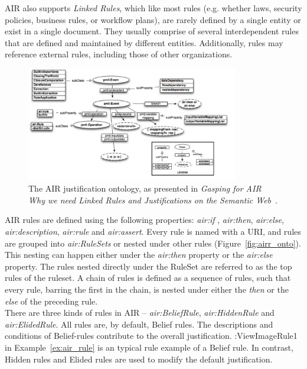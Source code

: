 AIR also supports \textit{Linked Rules}, which like most rules (e.g. whether laws, security policies, business rules, or workflow plans), are rarely defined by a single entity or exist in a single document. They usually comprise of several interdependent rules that are defined and maintained by different entities. Additionally, rules may reference external rules, including those of other organizations.\\

\begin{figure}[h]
  \begin{center}
    \includegraphics[width=350px]{img/airj_ontology.jpg}
        \caption{The AIR justification ontology, as presented in \textit{Gasping for AIR Why we need Linked Rules and Justifications on the Semantic Web}~\cite{kagal2011gasping}.}
        \label{fig:airj_onto}
  \end{center}
\end{figure}

AIR rules are defined using the following properties: \textit{air:if} , \textit{air:then}, \textit{air:else}, \textit{air:description}, \textit{air:rule} and \textit{air:assert}. Every rule is named with a URI, and rules are grouped into \textit{air:RuleSets} or nested under other rules (Figure~\ref{fig:airr_onto}). This nesting can happen either under the \textit{air:then} property or the \textit{air:else} property. The rules nested directly under the RuleSet are referred to as the top rules of the ruleset. A chain of rules is defined as a sequence of rules, such that every rule, barring the first in the chain, is nested under either the \textit{then} or the \textit{else} of the preceding rule.\\

There are three kinds of rules in AIR -- \textit{air:BeliefRule}, \textit{air:HiddenRule} and \textit{air:ElidedRule}. All rules are, by default, Belief rules. The descriptions and conditions of Belief-rules contribute to the overall justification. :ViewImageRule1 in Example~\ref{ex:air_rule} is an typical rule example of a Belief rule. In contrast, Hidden rules and Elided rules are used to modify the default justification.\\

